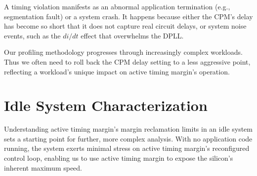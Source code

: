 A timing violation manifests as an abnormal application termination (e.g., segmentation fault) or a system crash. It happens because either the CPM's delay has become so short that it does not capture real circuit delays, or system noise events, such as the $di/dt$ effect that overwhelms the DPLL.

Our profiling methodology progresses through increasingly complex workloads. Thus we often need to roll back the CPM delay setting to a less aggressive point, reflecting a workload's unique impact on active timing margin's operation.

\section{Idle System Characterization}
\label{sec:process:idle}

Understanding active timing margin's margin reclamation limits in an idle system sets a starting point for further, more complex analysis. With no application code running, the system exerts minimal stress on active timing margin's reconfigured control loop, enabling us to use active timing margin to expose the silicon's inherent maximum speed.


